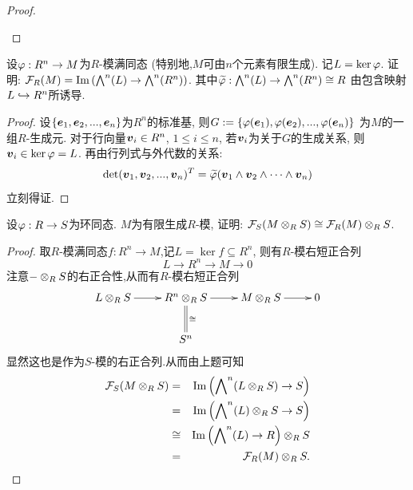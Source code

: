 \documentclass[oneside,a4papar,11pt,UTF8]{book}
\begin{document}
\begin{enumerate}[resume]
\begin{proof}
\begin{enumerate}
    \end{enumerate}
  \end{proof}

  \begin{prob}\label{ex-15-1-39}
    设$\varphi:R^n\to M$为$R$-模满同态
    (特别地,$M$可由$n$个元素有限生成).
    记$L=\ker\varphi$.
    证明: $\mathcal{F}_R(M)=
    \operatorname{Im}\left(\bigwedge\nolimits^n(L)
    \to\bigwedge\nolimits^n(R^n)\right)$.
    其中$\widetilde{\varphi}:
    \bigwedge\nolimits^n(L)\to\bigwedge\nolimits^n(R^n)\cong R$
    由包含映射$L\hookrightarrow R^n$所诱导.
  \end{prob}

  \begin{proof}
    设$\{\boldsymbol{e}_1,\boldsymbol{e}_2,...,\boldsymbol{e}_n\}$为$R^n$的标准基,
    则$G:=\{\varphi(\boldsymbol{e}_1),\varphi(\boldsymbol{e}_2),
    ...,\varphi(\boldsymbol{e}_n)\}$
    为$M$的一组$R$-生成元.
    对于行向量$\boldsymbol{v}_i\in R^n$, $1\leq i\leq n$,
    若$\boldsymbol{v}_i$为关于$G$的生成关系,
    则$\boldsymbol{v}_i\in\ker\varphi=L$.
    再由行列式与外代数的关系:
    \[\det(\boldsymbol{v}_1,\boldsymbol{v}_2,...,\boldsymbol{v}_n)^T
    =\widetilde{\varphi}(\boldsymbol{v}_1\wedge\boldsymbol{v}_2\wedge\cdots\wedge\boldsymbol{v}_n)\]
    立刻得证.
  \end{proof}

  \begin{prob}\label{ex-15-1-40}
    设$\varphi:R\to S$为环同态.
    $M$为有限生成$R$-模,
    证明: $\mathcal{F}_S(M\otimes_RS)\cong\mathcal{F}_R(M)\otimes_RS$.
  \end{prob}
\end{enumerate}

\begin{proof}
  取$R$-模满同态$f: R^n\to M$,记$L=\ker f\subseteq R^n$,
  则有$R$-模右短正合列
  \[
    L\to R^n\to M\to 0
  \]
  注意$-\otimes_RS$的右正合性,从而有$R$-模右短正合列
  \[
    \xymatrix{
       L\ten_RS
         \ar[r]
      &R^n\ten_RS
         \ar[r]
         \ar@{=}[d]^{\cong}
      &M\ten_RS
         \ar[r]
      &0
    \\
      &S^n
      &&
    }
  \]
  显然这也是作为$S$-模的右正合列.从而由上题可知
  \begin{eqnarray*}
    \mathcal{F}_S(M\otimes_RS)
  &=&
    \operatorname{Im}\left(
      \bigwedge\nolimits^n(L\otimes_RS)\to S
    \right)\\
  &=&
    \operatorname{Im}\left(
      \bigwedge\nolimits^n(L)\otimes_RS\to S
    \right)\\
  &\cong&
  \operatorname{Im}\left(
      \bigwedge\nolimits^n(L)\to R
    \right)\otimes_RS\\
  &=&
    \mathcal{F}_R(M)\otimes_RS.
  \end{eqnarray*}
\end{proof}
\end{document}

